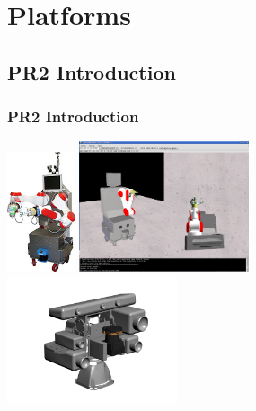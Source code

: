 \section{Platforms}
\subsection{PR2 Introduction}
\begin{frame}
  \frametitle{PR2 Introduction}
\includegraphics[width=2cm]{img/taser.jpg}
\hspace{5ex}
\includegraphics[width=5cm]{img/TASER_simulator1.png} \\[0cm]
\vspace{-6ex}
\hspace{33ex}\includegraphics[width=5cm]{img/ActivePerceptionStereoHead_Top_Front.png}
\end{frame}



